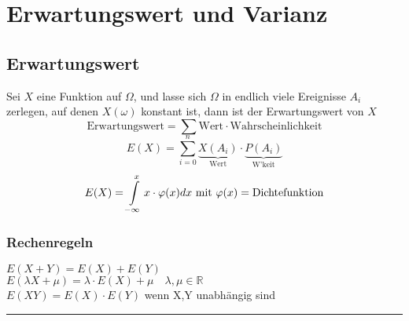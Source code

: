 \section{Erwartungswert und Varianz}

\subsection{Erwartungswert}
\begin{minipage}{0.49\textwidth}
	Sei $X$ eine Funktion auf $\Omega$, und lasse sich $\Omega$ in endlich viele Ereignisse $A_i$ zerlegen, auf denen $X(\omega)$ konstant ist, dann ist der Erwartungswert von $X$ 
	\[ \text{Erwartungswert} = \sum \text{Wert} \cdot \text{Wahrscheinlichkeit}\] 
	\[\boxed{E(X)=\sum\limits_{i=0}^n \underbrace{X(A_i)}_{\text{Wert}}\cdot 		\underbrace{P(A_i)}_{\text{W'keit}}}\]
	\[E(X) = \int\limits_{-\infty}^x x \cdot \varphi(x) dx$ mit $\varphi(x) = \text{Dichtefunktion}\] 
	\subsubsection{Rechenregeln}
	$E(X+Y)=E(X)+E(Y)$ \\
	$E(\lambda X + \mu) = \lambda \cdot E(X) + \mu \quad \lambda, \mu \in
	\mathbb{R}$ \\
	$E(XY) = E(X)\cdot E(Y)$ \quad  wenn X,Y unabhängig sind \\
\end{minipage}
\hspace{0.02\textwidth}
\begin{minipage}{0.49\textwidth}
	
\end{minipage}

\hrule

